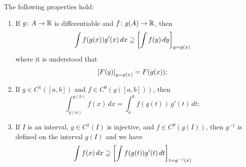 \begin{theorem}
The following properties hold:
\begin{enumerate}
\item
If $g\colon A \to {\mathbb R}$ is differentiable and $f\colon g(A) \to {\mathbb R}$, then
%
%
%
\begin{equation}\label{eq:sostituzione_1}
  \int f(g(x)) g'(x)\, dx \supseteq
  {\left[ \int f(y) \, dy \right]}_{y=g(x)}
\end{equation}
where it is understood that
\[
 {\left[ F(y) \right]}_{y=g(x)} = F(g(x));
\]

\item
If $g\in C^1([a,b])$ and $f\in C^0(g([a,b]))$, then
%
%
%
\begin{equation}\label{eq:sostituzione_2}
 \int_{g(a)}^{g(b)} f(x)\, dx = \int_a^b f(g(t))\, g'(t)\, dt;
\end{equation}

\item
If $I$ is an interval, $g\in C^1(I)$ is injective, and $f\in C^0(g(I))$, then
$g^{-1}$ is defined on the interval $g(I)$ and we have
%
%
%
\begin{equation}\label{eq:239455}
  \int f(x)\, dx \supseteq {\left[ \int f(g(t)) g'(t)\, dt \right]}_{t=g^{-1}(x)}
\end{equation}
\end{enumerate}
\end{theorem}
%
